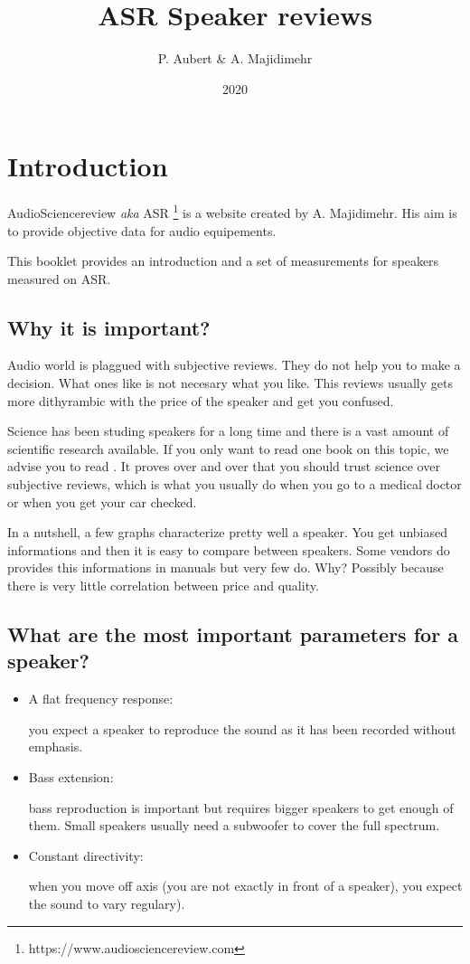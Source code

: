 \documentclass[11pt,oneside,a4paper]{report}
\begin{document}
\title{ASR Speaker reviews}
\author{P. Aubert \& A. Majidimehr}
\date{2020}
\maketitle

\listoffigures

\pagebreak

\chapter{Introduction}

AudioSciencereview \emph{aka} ASR \footnote{https://www.audiosciencereview.com} is a website created by A. Majidimehr.
His aim is to provide objective data for audio equipements.

This booklet provides an introduction and a set of measurements for speakers measured on ASR.

\section{Why it is important?}

Audio world is plaggued with subjective reviews. They do not help you to make a decision. What ones like is
not necesary what you like. This reviews usually gets more dithyrambic with the price of the speaker and
get you confused.

Science has been studing speakers for a long time and there is a vast amount of scientific research available.
If you only want to read one book on this topic, we advise you to read \cite{Toole2013}. It proves over and over
that you should trust science over subjective reviews, which is what you usually do when you go to a medical
doctor or when you get your car checked.

In a nutshell, a few graphs characterize pretty well a speaker. You get unbiased informations and then it is
easy to compare between speakers. Some vendors do provides this informations in manuals but very few do. Why?
Possibly because there is very little correlation between price and quality.

\section{What are the most important parameters for a speaker?}

\begin{itemize}
\item A flat frequency response:

  you expect a speaker to reproduce the sound as it has been recorded without emphasis.
\item Bass extension:

  bass reproduction is important but requires bigger speakers to get enough of them. Small speakers
  usually need a subwoofer to cover the full spectrum.
\item Constant directivity:

  when you move off axis (you are not exactly in front of a speaker), you expect the sound
  to vary regulary).
\end{itemize}
\end{document}
